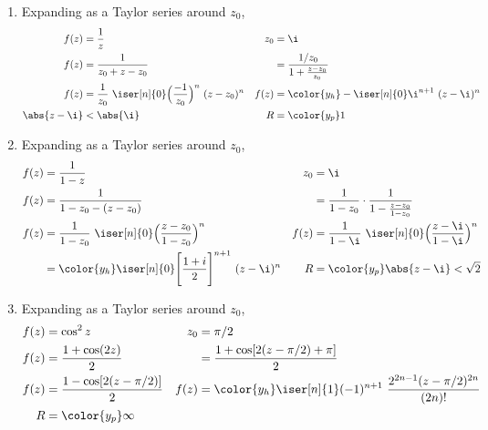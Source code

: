 \begin{enumerate}
    \item Expanding as a Taylor series around $ z_0 $,
          \begin{align}
              f(z)          & = \frac{1}{z}                                     &
              z_0           & = \i                                                \\
              f(z)          & = \frac{1}{z_0 + z - z_0}                         &
                            & = \frac{1/z_0}{1 + \frac{z - z_0}{z_0}}             \\
              f(z)          & = \frac{1}{z_0}\ \iser[n]{0} \Big( \frac{-1}{z_0}
              \Big)^n
              \ (z - z_0)^n &
              f(z)          & = \color{y_h} -\iser[n]{0} \i^{n+1}\ (z - \i)^n     \\
              \abs{z - \i}  & < \abs{\i}                                        &
              R             & = \color{y_p} 1
          \end{align}

    \item Expanding as a Taylor series around $ z_0 $,
          \begin{align}
              f(z)         & = \frac{1}{1 - z}                                   &
              z_0          & = \i                                                  \\
              f(z)         & = \frac{1}{1 - z_0 - (z - z_0)}                     &
                           & = \frac{1}{1-z_0} \cdot \frac{1}{1 - \frac{z - z_0}
              {1 - z_0}}                                                           \\
              f(z)         & = \frac{1}{1 - z_0}\ \iser[n]{0} \Big(
              \frac{z - z_0}{1 - z_0}
              \Big)^n      &
              f(z)         & = \frac{1}{1 - \i}\ \iser[n]{0} \Big(
              \frac{z - \i}{1 - \i} \Big)^n                                        \\
                           & = \color{y_h} \iser[n]{0} \Bigg[\frac{1+i}{2}
                  \Bigg]^{n+1}
              \ (z - \i)^n &
              R            & = \color{y_p} \abs{z - \i} < \sqrt{2}
          \end{align}

    \item Expanding as a Taylor series around $ z_0 $,
          \begin{align}
              f(z) & = \cos^2 z                                           &
              z_0  & = \pi/2                                                \\
              f(z) & = \frac{1 + \cos(2z)}{2}                             &
                   & = \frac{1 + \cos[2(z - \pi/2) + \pi]}{2}               \\
              f(z) & = \frac{1 - \cos[2(z - \pi/2)]}{2}                   &
              f(z) & = \color{y_h} \iser[n]{1} (-1)^{n+1}\ \frac{2^{2n-1}
              (z - \pi/2)^{2n}}{(2n)!}                                      \\
              R    & = \color{y_p} \infty
          \end{align}


\end{enumerate}
